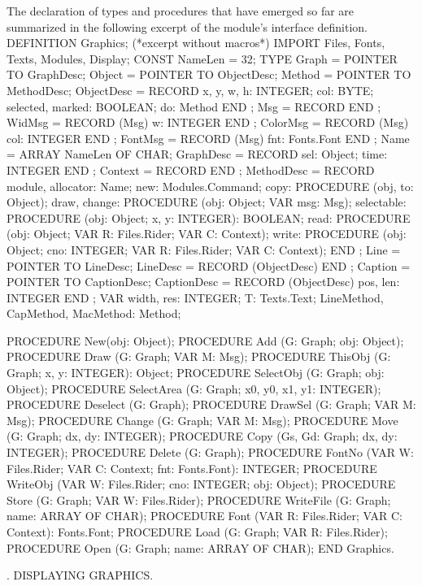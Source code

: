 The declaration of types and procedures that have emerged so far are summarized in the following excerpt of the module's interface definition.
\begintt
DEFINITION Graphics; (*excerpt without macros*)
  IMPORT Files, Fonts, Texts, Modules, Display;
  CONST NameLen = 32;
  TYPE Graph = POINTER TO GraphDesc;
  Object = POINTER TO ObjectDesc;
  Method = POINTER TO MethodDesc;
  ObjectDesc = RECORD
    x, y, w, h: INTEGER;
    col: BYTE;
    selected, marked: BOOLEAN;
    do: Method
  END ;
  Msg = RECORD END ;
  WidMsg = RECORD (Msg) w: INTEGER END ;
  ColorMsg = RECORD (Msg) col: INTEGER END ;
  FontMsg = RECORD (Msg) fnt: Fonts.Font END ;
  Name = ARRAY NameLen OF CHAR;
  GraphDesc = RECORD sel: Object;
    time: INTEGER
  END ;
  Context = RECORD END ;
  MethodDesc = RECORD
    module, allocator: Name;
    new: Modules.Command;
    copy: PROCEDURE (obj, to: Object);
    draw, change: PROCEDURE (obj: Object; VAR msg: Msg);
    selectable: PROCEDURE (obj: Object;
      x, y: INTEGER): BOOLEAN;
    read: PROCEDURE (obj: Object;
             VAR R: Files.Rider; VAR C: Context);
    write: PROCEDURE (obj: Object; cno: INTEGER;
             VAR R: Files.Rider; VAR C: Context);
  END ;
  Line = POINTER TO LineDesc;
  LineDesc = RECORD (ObjectDesc) END ;
  Caption = POINTER TO CaptionDesc;
  CaptionDesc = RECORD (ObjectDesc) pos, len: INTEGER END ;
    VAR width, res: INTEGER;
    T: Texts.Text;
    LineMethod, CapMethod, MacMethod: Method;
    
PROCEDURE New(obj: Object);
PROCEDURE Add (G: Graph; obj: Object);
PROCEDURE Draw (G: Graph; VAR M: Msg);
PROCEDURE ThisObj (G: Graph; x, y: INTEGER): Object;
PROCEDURE SelectObj (G: Graph; obj: Object);
PROCEDURE SelectArea (G: Graph;
  x0, y0, x1, y1: INTEGER);
PROCEDURE Deselect (G: Graph);
PROCEDURE DrawSel (G: Graph; VAR M: Msg);
PROCEDURE Change (G: Graph; VAR M: Msg);
PROCEDURE Move (G: Graph; dx, dy: INTEGER);
PROCEDURE Copy (Gs, Gd: Graph; dx, dy: INTEGER);
PROCEDURE Delete (G: Graph);
PROCEDURE FontNo (VAR W: Files.Rider;
  VAR C: Context; fnt: Fonts.Font): INTEGER;
PROCEDURE WriteObj (VAR W: Files.Rider;
  cno: INTEGER; obj: Object);
PROCEDURE Store (G: Graph; VAR W: Files.Rider);
PROCEDURE WriteFile (G: Graph; name: ARRAY OF CHAR);
PROCEDURE Font (VAR R: Files.Rider;
  VAR C: Context): Fonts.Font;
PROCEDURE Load (G: Graph; VAR R: Files.Rider);
PROCEDURE Open (G: Graph; name: ARRAY OF CHAR);
END Graphics.
\endtt

. DISPLAYING GRAPHICS.

